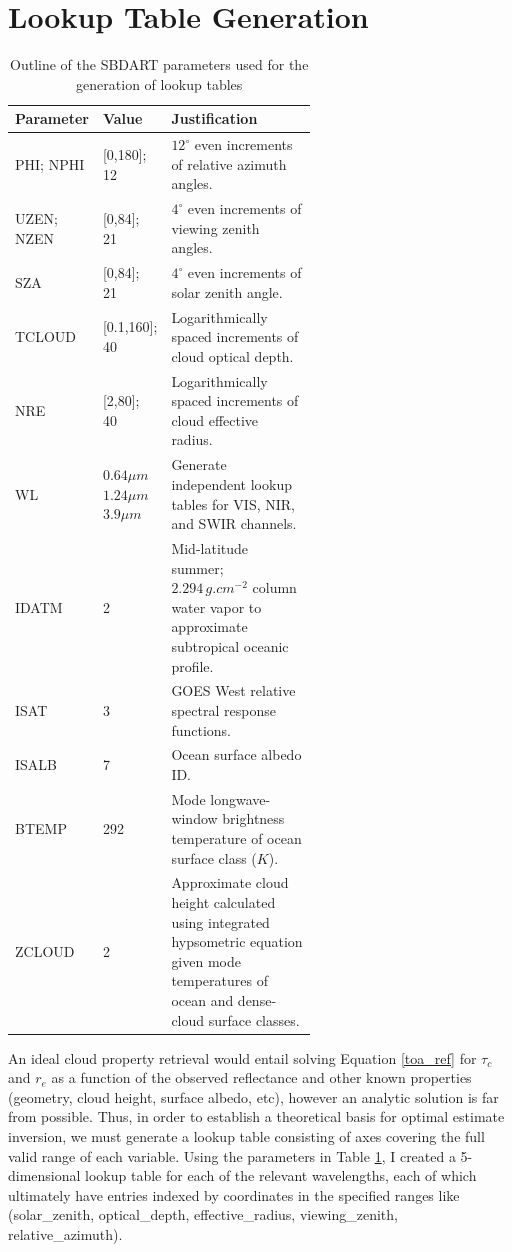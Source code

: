 \documentclass[12pt]{article}
\begin{document}
\section{Lookup Table Generation}

\begin{table}[h!]
    \centering
    \begin{tabular}{ m{.15\linewidth} | m{.15\linewidth} | m{0.6\linewidth}}
        \textbf{Parameter} & \textbf{Value} & \textbf{Justification} \\
        \hline
        PHI; NPHI & [0,180]; 12 & $12^\circ$ even increments of relative azimuth angles. \\
        \hline
        UZEN; NZEN & [0,84]; 21 & $4^\circ$ even increments of viewing zenith angles. \\
        \hline
        SZA & [0,84]; 21 & $4^\circ$ even increments of solar zenith angle. \\
        \hline
        TCLOUD & [0.1,160]; 40 & Logarithmically spaced increments of cloud optical depth. \\
        \hline
        NRE & [2,80]; 40 & Logarithmically spaced increments of cloud effective radius. \\
        \hline
        WL & $0.64\mu m$ $1.24\mu m$ $3.9\mu m$ & Generate independent lookup tables for VIS, NIR, and SWIR channels. \\
        \hline
        IDATM & 2 & Mid-latitude summer; $2.294\,\si{g.cm^{-2}}$ column water vapor to approximate subtropical oceanic profile. \\
        \hline
        ISAT & 3 & GOES West relative spectral response functions. \\
        \hline
        ISALB & 7 & Ocean surface albedo ID. \\
        \hline
        BTEMP & 292 & Mode longwave-window brightness temperature of ocean surface class ($\si{K}$). \\
        \hline
        ZCLOUD & 2 & Approximate cloud height calculated using integrated hypsometric equation given mode temperatures of ocean and dense-cloud surface classes. \\
    \end{tabular}
    \caption{Outline of the SBDART parameters used for the generation of lookup tables}
    \label{sbdart_params}
\end{table}

An ideal cloud property retrieval would entail solving Equation \ref{toa_ref} for $\tau_c$ and $r_e$ as a function of the observed reflectance and other known properties (geometry, cloud height, surface albedo, etc), however an analytic solution is far from possible. Thus, in order to establish a theoretical basis for optimal estimate inversion, we must generate a lookup table consisting of axes covering the full valid range of each variable. Using the parameters in Table \ref{sbdart_params}, I created a 5-dimensional lookup table for each of the relevant wavelengths, each of which ultimately have entries indexed by coordinates in the specified ranges like (solar\_zenith, optical\_depth, effective\_radius, viewing\_zenith, relative\_azimuth).
\end{document}
